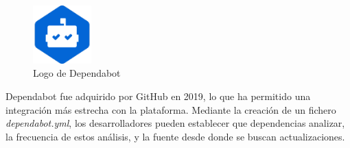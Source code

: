 \begin{figure}[ht]
    \centering
    \includegraphics[width=0.2\textwidth]{Figures/dependabot-logo}
    \decoRule
    \caption[Dependabot (Logo)]{Logo de Dependabot \emph{\parencite{Reference25}}}
    \label{fig:dependabot-logo}
\end{figure}

Dependabot fue adquirido por GitHub en 2019, lo que ha permitido una integración más estrecha con la plataforma. Mediante la creación de un fichero \emph{dependabot.yml}, los desarrolladores pueden establecer que dependencias analizar, la frecuencia de estos análisis, y la fuente desde donde se buscan actualizaciones. \emph{\parencite{Reference24}}

